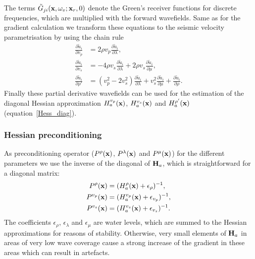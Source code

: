 The terms $\tilde G_{ji}(\textbf x,\omega_v;\textbf x_r,0)$ denote the Green's receiver functions for discrete frequencies, which are multiplied with the forward wavefields. Same as for the gradient calculation we transform these equations to the seismic velocity parametrisation by using the chain rule
 \begin{equation}
\begin{split}
 \frac{\partial\tilde u_i}{\partial v_p}& =2\rho v_p\frac{\partial\tilde u_i}{\partial\lambda},
\\
\frac{\partial\tilde u_i}{\partial v_s}& = -4\rho v_s\frac{\partial\tilde u_i}{\partial\lambda}+2\rho v_s\frac{\partial\tilde u_i}{\partial\mu},
\\
\frac{\partial\tilde u_i}{\partial\rho'}& = (v_p^2-2v_s^2)\frac{\partial\tilde u_i}{\partial\lambda}+v_s^2\frac{\partial\tilde u_i}{\partial\mu}+\frac{\partial\tilde u_i}{\partial\rho}.
\end{split}\label{equ:partial_wave2}
\end{equation}
Finally these partial derivative wavefields can be used for the estimation of the diagonal Hessian approximation $H_a^{v_p}(\textbf x)$, $H_a^{v_s}(\textbf x)$ and $H_a^{\rho'}(\textbf x)$ (equation~\ref{Hess_diag}).
\subsubsection*{Hessian preconditioning}
As preconditioning operator ($P^\rho(\textbf x)$, $P^\lambda(\textbf x)$ and $P^\mu(\textbf x)$) for the different parameters we use the inverse of the diagonal of $\textbf H_a$, which is straightforward for a diagonal matrix:
\begin{equation}
 \begin{split}
 P^\rho(\textbf x) & = (H_a^\rho(\textbf x)+\epsilon_\rho)^{-1},\\
 P^{v_p}(\textbf x) & = (H_a^{v_p}(\textbf x)+\epsilon_{v_p})^{-1},\\
 P^{v_s}(\textbf x) & = (H_a^{v_s}(\textbf x)+\epsilon_{v_s})^{-1}.
\end{split}\label{Hess_precon}
\end{equation}
The coefficients $\epsilon_\rho$, $\epsilon_\lambda$ and $\epsilon_\mu$ are water levels, which are summed to the Hessian approximations for reasons of stability. Otherwise, very small elements of $\textbf H_a$ in areas of very low wave coverage cause a strong increase of the gradient in these areas which can result in artefacts.
